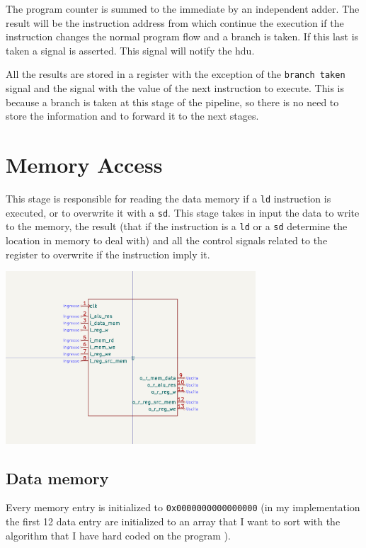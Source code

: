 \documentclass{article}
\begin{document}
The program counter is summed to the immediate by an independent adder. The result will be the
instruction address from which continue the execution if the instruction changes the normal
program flow and a branch is taken. If this last is taken a signal is asserted. This signal
will notify the \acrshort{hdu}.

All the results are stored in a register with the exception of the \texttt{branch taken} signal and 
the signal with the value of the next instruction to execute. This is because a branch is taken
at this stage of the pipeline, so there is no need to store the information and to forward it
to the next stages.


\section{Memory Access}
\begin{minipage}{0.48\textwidth}
This stage is responsible for reading the data memory if a \texttt{ld} instruction is executed, 
or to overwrite it with a \texttt{sd}. 
This stage takes in input the data to write to the memory, the \ALU result (that if the
instruction is a \texttt{ld} or a \texttt{sd} determine the location in memory to deal with)
and all the control signals related to the register to overwrite if the instruction imply it.


\end{minipage}
\begin{minipage}{0.48\textwidth}
  \includegraphics[width=0.7\textwidth,right,trim={350 150 350 150},clip]{components/MemoryAccess.png}
\end{minipage}

\subsection{Data memory}\label{D_MEM}
Every memory entry is initialized to \texttt{0x0000000000000000} (in my implementation the first 12 data
entry are initialized to an array that I want to sort with the \sort algorithm that I have hard coded on
the program \ROM).
\end{document}
